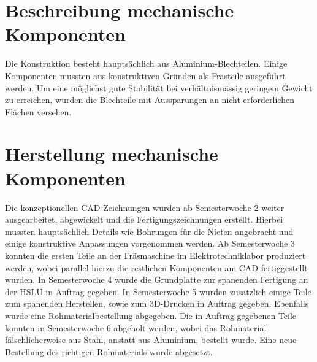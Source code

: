 \section{Beschreibung mechanische Komponenten}
Die Konstruktion besteht hauptsächlich aus Aluminium-Blechteilen. Einige 
Komponenten mussten aus konstruktiven Gründen als Frästeile ausgeführt werden.
Um eine möglichst gute Stabilität bei verhältnismässig geringem Gewicht zu 
erreichen, wurden die Blechteile mit Aussparungen an nicht erforderlichen 
Flächen versehen.

\section{Herstellung mechanische Komponenten}
Die konzeptionellen CAD-Zeichnungen wurden ab Semesterwoche 2 weiter 
ausgearbeitet, abgewickelt und die Fertigungszeichnungen erstellt. Hierbei 
mussten hauptsächlich Details wie Bohrungen für die Nieten angebracht und 
einige konstruktive Anpassungen vorgenommen werden. Ab Semesterwoche 3 konnten 
die ersten Teile an der Fräsmaschine im Elektrotechniklabor produziert werden, 
wobei parallel  hierzu die restlichen Komponenten am CAD fertiggestellt wurden.
In Semesterwoche 4 wurde die Grundplatte zur spanenden Fertigung an der HSLU 
in Auftrag gegeben.
In Semesterwoche 5 wurden zusätzlich einige Teile zum spanenden Herstellen, 
sowie zum 3D-Drucken in Auftrag gegeben. Ebenfalls wurde eine 
Rohmaterialbestellung abgegeben.
Die in Auftrag gegebenen Teile konnten in Semesterwoche 6 abgeholt werden, 
wobei das  Rohmaterial fälschlicherweise aus Stahl, anstatt aus Aluminium, 
bestellt wurde. Eine neue Bestellung des richtigen Rohmaterials wurde abgesetzt.
